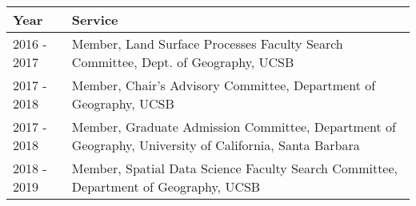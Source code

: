 
\begin{longtable}{lp{15cm}}
Year & Service\\
\hline 
\endhead 
2016 - 2017 & Member, Land Surface Processes Faculty Search Committee, Dept. of Geography, UCSB \\
2017 - 2018 & Member, Chair's Advisory Committee, Department of Geography, UCSB \\
2017 - 2018 & Member, Graduate Admission Committee, Department of Geography, University of California, Santa Barbara \\
2018 - 2019 & Member, Spatial Data Science Faculty Search Committee, Department of Geography, UCSB \\
\end{longtable}

